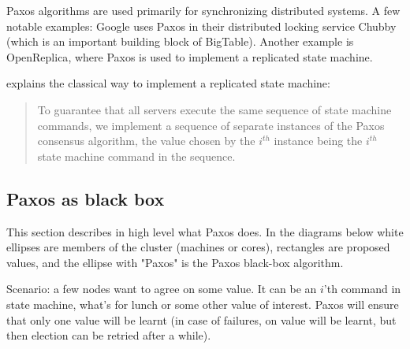 \documentclass[english,11pt]{l4proj}
\begin{document}
Paxos algorithms are used primarily for synchronizing distributed systems. A few
notable examples: Google uses Paxos in their distributed locking service
Chubby\cite{chubby} (which is an important building block of BigTable). Another
example is OpenReplica\cite{openreplica}, where Paxos is used to implement a
replicated state machine.

\cite{paxos-simple} explains the classical way to implement a replicated state
machine:

\begin{quote}
To guarantee that all servers execute the same sequence of state machine
commands, we implement a sequence of separate instances of the Paxos consensus
algorithm, the value chosen by the $i^{th}$ instance being the $i^{th}$ state
machine command in the sequence.
\end{quote}

\subsection{Paxos as black box}

This section describes in high level what Paxos does. In the diagrams below
white ellipses are members of the cluster (machines or cores), rectangles are
proposed values, and the ellipse with "Paxos" is the Paxos black-box algorithm.

Scenario: a few nodes want to agree on some value. It can be an $i$'th command in
state machine, what's for lunch or some other value of interest. Paxos will
ensure that only one value will be learnt (in case of failures, on value will be
learnt, but then election can be retried after a while).
\end{document}
